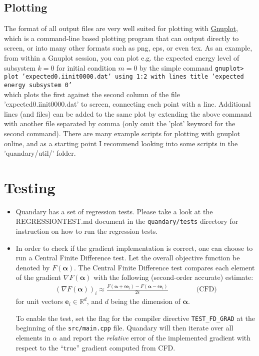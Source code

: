 \documentclass[11pt]{article}
\newcommand{\R}{\mathds{R}}
\newcommand{\bfa}{\boldsymbol{\alpha}}
\newcommand{\bs}[1]{{\boldsymbol{#1}}}
\begin{document}
\subsection{Plotting}
The format of all output files are very well suited for plotting with \href{http://www.gnuplot.info}{Gnuplot}, which is a command-line based plotting program that can output directly to screen, or into many other formats such as png, eps, or even tex. As an example, from within a Gnuplot session, you can plot e.g. the expected energy level of subsystem $k=0$ for initial condition $m=0$ by the simple command\newline
\texttt{gnuplot> plot 'expected0.iinit0000.dat' using 1:2 with lines title 'expected energy subsystem 0'} 
\\
which plots the first against the second column of the file 'expected0.iinit0000.dat' to screen, connecting each point with a line. Additional lines (and files) can be added to the same plot by extending the above command with another file separated by comma (only omit the 'plot' keyword for the second command). There are many example scripts for plotting with gnuplot online, and as a starting point I recommend looking into some scripts in the 'quandary/util/' folder.

\section{Testing}
  \begin{itemize}
    \item Quandary has a set of regression tests. Please take a look at the REGRESSIONTEST.md document in the \verb+quandary/tests+ directory for instruction on how to run the regression tests. 
    \item In order to check if the gradient implementation is correct, one can choose to run a Central Finite Difference test. Let the overall objective function be denoted by $F(\boldsymbol{\alpha})$. The Central Finite Difference test compares each element of the gradient $\nabla F(\boldsymbol{\alpha})$ with the following (second-order accurate) estimate:
    \begin{align*}
       \left(\nabla F(\boldsymbol{\alpha}) \right)_i \approx \frac{F(\bfa + \epsilon\bs{e}_i) - F(\bfa - \epsilon\bs{e}_i)}{2\epsilon} \qquad \qquad \text{(CFD)}
    \end{align*}
    for unit vectors $\bs{e}_i\in \R^d$, and $d$ being the dimension of $\bfa$. 

    To enable the test, set the flag for the compiler directive \texttt{TEST\_FD\_GRAD} at the beginning of the \texttt{src/main.cpp} file. Quandary will then iterate over all elements in $\alpha$ and report the \textit{relative} error of the implemented gradient with respect to the ``true'' gradient computed from CFD. 

  \end{itemize}
\end{document}
